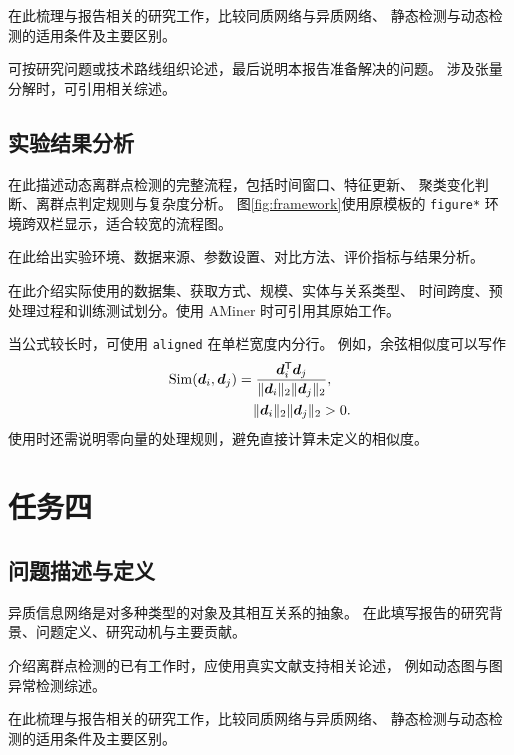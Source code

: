 \documentclass[sigconf,nonacm,screen]{acmart}
\begin{document}
在此梳理与报告相关的研究工作，比较同质网络与异质网络、
静态检测与动态检测的适用条件及主要区别。

可按研究问题或技术路线组织论述，最后说明本报告准备解决的问题。
涉及张量分解时，可引用相关综述\cite{kolda2009}。

\subsection{实验结果分析}
\label{sec:task3-result}
在此描述动态离群点检测的完整流程，包括时间窗口、特征更新、
聚类变化判断、离群点判定规则与复杂度分析。
图\ref{fig:framework}使用原模板的 \texttt{figure*} 环境跨双栏显示，适合较宽的流程图。

在此给出实验环境、数据来源、参数设置、对比方法、评价指标与结果分析。

在此介绍实际使用的数据集、获取方式、规模、实体与关系类型、
时间跨度、预处理过程和训练测试划分。使用 AMiner 时可引用其原始工作\cite{tang2008}。

当公式较长时，可使用 \texttt{aligned} 在单栏宽度内分行。
例如，余弦相似度可以写作
\begin{equation}
  \begin{aligned}
    \operatorname{Sim}(\bm{d}_i,\bm{d}_j)
      &=\frac{\bm{d}_i^{\mathsf T}\bm{d}_j}
        {\lVert\bm{d}_i\rVert_2\lVert\bm{d}_j\rVert_2},\\
    &\hspace{4mm}\lVert\bm{d}_i\rVert_2\lVert\bm{d}_j\rVert_2>0.
  \end{aligned}
  \label{eq:similarity}
\end{equation}
使用时还需说明零向量的处理规则，避免直接计算未定义的相似度。

\section{任务四}
\label{sec:task4}
\subsection{问题描述与定义}
\label{sec:task4-problem}
异质信息网络是对多种类型的对象及其相互关系的抽象。
在此填写报告的研究背景、问题定义、研究动机与主要贡献。

介绍离群点检测的已有工作时，应使用真实文献支持相关论述，
例如动态图与图异常检测综述\cite{akoglu2015}。

在此梳理与报告相关的研究工作，比较同质网络与异质网络、
静态检测与动态检测的适用条件及主要区别。
\end{document}
